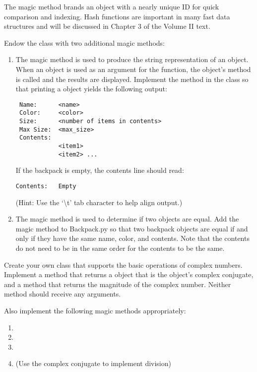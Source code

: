 \begin{info}
The  magic method brands an object with a nearly unique ID for quick comparison and indexing.
Hash functions are important in many fast data structures and will be discussed in Chapter 3 of the Volume II text.
\end{info}

\begin{problem}
Endow the  class with two additional magic methods:
\begin{enumerate}
\item The  magic method is used to produce the string representation of an object.
When an object is used as an argument for the  function, the object's  method is called and the results are displayed.
Implement the  method in the  class so that printing a  object yields the following output:
\begin{lstlisting}
 Name:		<name>
 Color:		<color>
 Size:		<number of items in contents>
 Max Size:	<max_size>
 Contents:
 			<item1>
 			<item2> ...
\end{lstlisting}
If the backpack is empty, the contents line should read:
\begin{lstlisting}
Contents:	Empty
\end{lstlisting}
(Hint: Use the `\textbackslash{t}' tab character to help align output.)

\item The  magic method is used to determine if two objects are equal. Add the  magic method to Backpack.py so that two backpack objects are equal if and only if they have the same name, color, and contents. Note that the contents do not need to be in the same order for the contents to be the same.
\end{enumerate}
\end{problem}

\begin{problem}
Create your own  class that supports the basic operations of complex numbers. Implement a  method that returns a  object that is the object's complex conjugate, and a  method that returns the magnitude of the complex number.
Neither method should receive any arguments.

Also implement the following magic methods appropriately:
\begin{enumerate}
\item {}
\item {}
\item {}
\item {} (Use the complex conjugate to implement division)
\end{enumerate}
\end{problem}
